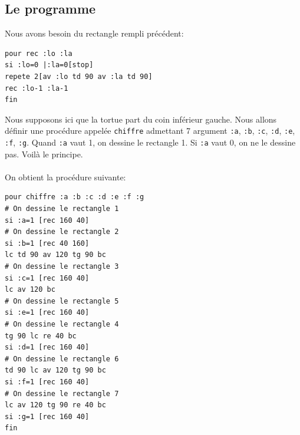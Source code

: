 \subsection{Le programme}
\noindent Nous avons besoin du rectangle rempli précédent:
\begin{verbatim}
pour rec :lo :la
si :lo=0 |:la=0[stop]
repete 2[av :lo td 90 av :la td 90]
rec :lo-1 :la-1
fin
\end{verbatim}
Nous supposons ici que la tortue part du coin inférieur gauche. Nous allons définir une procédure appelée \texttt{chiffre} admettant 7 argument \texttt{:a}, \texttt{:b}, \texttt{:c}, \texttt{:d}, \texttt{:e}, \texttt{:f}, \texttt{:g}. Quand \texttt{:a} vaut 1, on dessine le rectangle 1. Si \texttt{:a} vaut 0, on ne le dessine pas. Voilà le principe.\\ \\
On obtient la procédure suivante:
\begin{verbatim}
pour chiffre :a :b :c :d :e :f :g
# On dessine le rectangle 1
si :a=1 [rec 160 40]
# On dessine le rectangle 2
si :b=1 [rec 40 160]
lc td 90 av 120 tg 90 bc
# On dessine le rectangle 3
si :c=1 [rec 160 40]
lc av 120 bc
# On dessine le rectangle 5
si :e=1 [rec 160 40]
# On dessine le rectangle 4
tg 90 lc re 40 bc
si :d=1 [rec 160 40]
# On dessine le rectangle 6
td 90 lc av 120 tg 90 bc
si :f=1 [rec 160 40]
# On dessine le rectangle 7
lc av 120 tg 90 re 40 bc 
si :g=1 [rec 160 40]
fin
\end{verbatim}
